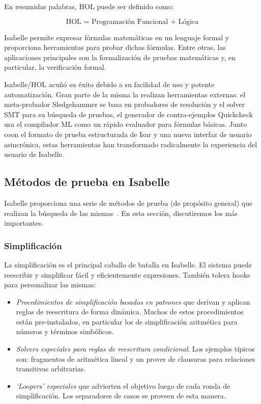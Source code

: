 \documentclass[12pt]{book}
\begin{document}
En resumidas palabras, HOL puede ser definido como:

\[ \boxed{\text{HOL = Programación Funcional + Lógica}} \]

Isabelle permite expresar fórmulas matemáticas en un lenguaje formal y proporciona herramientas para probar dichas fórmulas. Entre otras, las aplicaciones principales son la formalización de pruebas matemáticas y, en particular, la verificación formal.

Isabelle/HOL acuñó su éxito debido a su facilidad de uso y potente automatización. Gran parte de la misma la realizan herramientas externas: el meta-probador Sledgehammer se basa en probadores de resolución y el solver SMT para su búsqueda de pruebas, el generador de contra-ejemplos Quickcheck usa el compilador ML como un rápido evaluador para fórmulas básicas. Junto coon el formato de prueba estructurada de Isar y una nueva interfaz de usuario asincrónica, estas herramientas han transformado radicalmente la experiencia del usuario de Isabelle.

\subsection{Métodos de prueba en Isabelle}

Isabelle proporciona una serie de métodos de prueba (de propósito general) que realizan la búsqueda de las mismas~\cite{proof_and_disproof}. En esta sección, discutiremos los más importantes.

\subsubsection{Simplificación}

La simplificación es el principal caballo de batalla en Isabelle. El sistema puede reescribir y simplificar fácil y eficientemente expresiones. También tolera hooks para personalizar las mismas:

\begin{itemize}
	\item \textit{Procedimientos de simplificación basados en patrones} que derivan y aplican reglas de reescritura de forma dinámica. Muchos de estos procedimientos están pre-instalados, en particular los de simplificación aritmética para números y términos simbólicos.
	\item \textit{Solvers especiales para reglas de reescritura condicional}. Los ejemplos típicos son: fragmentos de aritmética lineal y un prover de clausuras para relaciones transitivas arbitrarias.
	\item \textit{`Loopers' especiales} que advierten el objetivo luego de cada ronda de simplificación. Los separadores de casos se proveen de esta manera.
\end{itemize}
\end{document}

